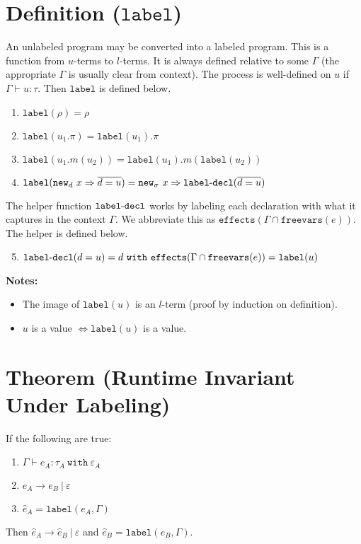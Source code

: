 \documentclass{llncs}
\newcommand{\keywadj}[1]{\mathtt{#1}}
\newcommand{\keyw}[1]{\keywadj{#1}~}
\newcommand{\kw}[1]{\keyw{ #1 }}
\newcommand{\kwa}[1]{\keywadj{ #1 }}
\newcommand{\hyphen}{\hbox{-}}
\newcommand{\type}[2]{
	#1~\keyw{with} #2
}
\newcommand{\newd}[0]{
	\keywadj{new}_d~x \Rightarrow \overline{d = u}
}
\begin{document}
\section{Definition ($\keywadj{label}$)}
An unlabeled program may be converted into a labeled program. This is a function from $u$-terms to $l$-terms. It is always defined relative to some $\Gamma$ (the appropriate $\Gamma$ is usually clear from context). The process is well-defined on $u$ if $\Gamma \vdash u : \tau$. Then $\kwa{label}$ is defined below.

\begin{enumerate}
	\item $\kwa{label}(\rho) = \rho$
	\item $\kwa{label}(u_1.\pi) = \kwa{label}(u_1).\pi$
	\item $\kwa{label}(u_1.m(u_2)) = \kwa{label}(u_1).m(\kwa{label}(u_2))$
	\item $\kwa{label}(\newd) = \kwa{new}_\sigma~x \Rightarrow \kwa{label \hyphen decl}(\overline{d = u})$
\end{enumerate}

\noindent
The helper function $\kwa{label \hyphen decl}$ works by labeling each declaration with what it captures in the context $\Gamma$. We abbreviate this as $\kwa{effects}(\Gamma \cap \kwa{freevars}(e))$. The helper is defined below.

\begin{enumerate}
  \setcounter{enumi}{4}
  \item $\kwa{label \hyphen decl}(d = u) = d~\kw{with} \kwa{effects}(\Gamma \cap \kwa{freevars}(e)) = \kwa{label}(u)$
\end{enumerate}

\noindent \textbf{Notes:}
\begin{itemize}
	\item The image of $\kwa{label}(u)$ is an $l$-term (proof by induction on definition).
	\item $u$ is a value $\iff \kwa{label}(u)$ is a value.
\end{itemize}


\section{Theorem (Runtime Invariant Under Labeling)}

If the following are true:
	\begin{enumerate}
	\item $\Gamma \vdash e_A : \type{\tau_A}{\varepsilon_A}$
	\item $e_A \longrightarrow e_B~|~\varepsilon$
	\item $\hat e_A = \keywadj{label}(e_A, \Gamma)$
	\end{enumerate}
Then $\hat e_A \longrightarrow \hat e_B~|~\varepsilon$ and $\hat e_B = \keywadj{label}(e_B, \Gamma)$.
\end{document}
